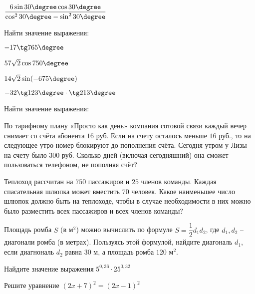 \begin{listofex}
\begin{enumcols}[itemcolumns=2]
			\item \( \dfrac{6\sin30\degree\cos30\degree}{\cos^230\degree-\sin^230\degree} \)
		\end{enumcols}
		\item Найти значение выражения:
		\begin{enumcols}[itemcolumns=2]
			\item \( -17\tg765\degree \)
			\item \( 57\sqrt{2}\cos750\degree \)
			\item \( 14\sqrt{2}\sin(-675\degree) \)
			\item \( -32\tg123\degree\cdot\tg213\degree \)
		\end{enumcols}
		\item Найти значение выражения:
		\begin{enumcols}[itemcolumns=1]
			\item {}
			\item {}
			\item {}
			\item {}
			\item {}
			\item {}
		\end{enumcols}
	\item По тарифному плану «Просто как день» компания сотовой связи каждый вечер снимает со счёта абонента \( 16 \) руб. Если на счету осталось меньше \( 16 \) руб., то на следующее утро номер блокируют до пополнения счёта. Сегодня утром у Лизы на счету было \( 300 \) руб. Сколько дней (включая сегодняшний) она сможет пользоваться телефоном, не пополняя счёт?
	\item Теплоход рассчитан на \( 750 \) пассажиров и \( 25 \) членов команды. Каждая спасательная шлюпка может вместить \( 70 \) человек. Какое наименьшее число шлюпок должно быть на теплоходе, чтобы в случае необходимости в них можно было разместить всех пассажиров и всех членов команды?
	\item Площадь ромба \( S \) (в м\( ^2 \))  можно вычислить по формуле \( S=\dfrac{1}{2}d_1d_2 \), где \( d_1, d_2 \) -- диагонали ромба (в метрах). Пользуясь этой формулой, найдите диагональ \( d_1 \), если диагнональ \( d_2 \) равна \( 30 \) м, а площадь ромба \( 120 \) м\( ^2 \).
	\item Найдите значение выражения \( 5^{0,36}\cdot25^{0,32} \)
	\item Решите уравнение \( (2x+7)^2=(2x-1)^2 \)
\end{listofex}
%
%
%	
%
%
%	
